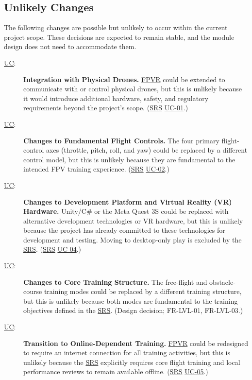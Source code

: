 \documentclass[12pt, titlepage]{article}
\DeclareRobustCommand{\mgabbr}[2]{\hyperlink{mg-abbr:#1}{#2}}
\newcounter{ucnum}
\newcommand{\uctheucnum}{\mgabbr{uc}{UC}\theucnum}
\begin{document}
\subsection{Unlikely Changes} \label{SecUchange}

The following changes are possible but unlikely to occur
within the current project scope. These decisions are
expected to remain stable, and the module design does
not need to accommodate them.

\begin{description}

\item[ \uctheucnum \label{ucSimulation}:]
\textbf{Integration with Physical Drones.}
\mgabbr{fpvr}{FPVR} could be extended to communicate with or control
physical drones, but this is unlikely because it would
introduce additional hardware, safety, and regulatory
requirements beyond the project's scope. (\mgabbr{srs}{SRS} \mgabbr{uc}{UC-01}.)

\item[ \uctheucnum \label{ucAxes}:]
\textbf{Changes to Fundamental Flight Controls.}
The four primary flight-control axes (throttle, pitch,
roll, and yaw) could be replaced by a different control
model, but this is unlikely because they are fundamental
to the intended FPV training experience. (\mgabbr{srs}{SRS} \mgabbr{uc}{UC-02}.)

\item[ \uctheucnum \label{ucPlatform}:]
\textbf{Changes to Development Platform and Virtual Reality (VR) Hardware.}
Unity/C\# or the Meta Quest 3S could be replaced with
alternative development technologies or VR hardware,
but this is unlikely because the project has already
committed to these technologies for development
and testing. Moving to desktop-only play is excluded by
the \mgabbr{srs}{SRS}. (\mgabbr{srs}{SRS} \mgabbr{uc}{UC-04}.)

\item[ \uctheucnum \label{ucTraining}:]
\textbf{Changes to Core Training Structure.}
The free-flight and obstacle-course training modes
could be replaced by a different training structure,
but this is unlikely because both modes are
fundamental to the training objectives defined
in the \mgabbr{srs}{SRS}. (Design decision; FR-LVL-01, FR-LVL-03.)

\item[ \uctheucnum \label{ucPerformance}:]
\textbf{Transition to Online-Dependent Training.}
\mgabbr{fpvr}{FPVR} could be redesigned to require an internet
connection for all training activities, but this is
unlikely because the \mgabbr{srs}{SRS} explicitly requires core
flight training and local performance reviews to
remain available offline. (\mgabbr{srs}{SRS} \mgabbr{uc}{UC-05}.)


\end{description}
\end{document}
